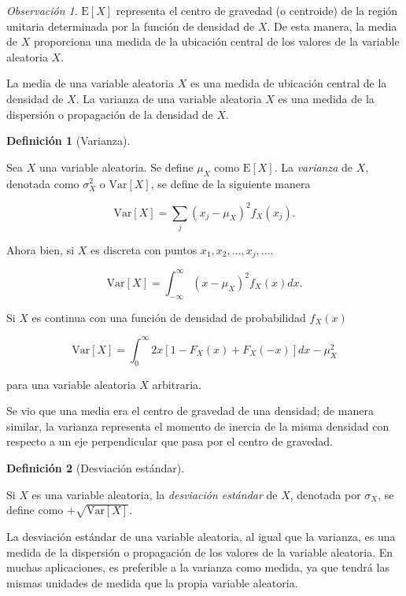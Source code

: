 \documentclass[
  us-letterpaper,
]{scrreprt}
\theoremstyle{plain}
\theoremstyle{definition}
\newtheorem{definition}{Definición}[chapter]
\theoremstyle{definition}
\theoremstyle{plain}
\theoremstyle{remark}
\newtheorem*{remark}{Observación}
\begin{document}
\begin{remark}
\(\mathrm E[X]\) representa el centro de gravedad (o centroide) de la
región unitaria determinada por la función de densidad de \(X\). De esta
manera, la media de \(X\) proporciona una medida de la ubicación central
de los valores de la variable aleatoria \(X\).
\end{remark}

La media de una variable aleatoria \(X\) es una medida de ubicación
central de la densidad de \(X\). La varianza de una variable aleatoria
\(X\) es una medida de la dispersión o propagación de la densidad de
\(X\).

\begin{definition}[Varianza]\protect\hypertarget{def-var}{}\label{def-var}

Sea \(X\) una variable aleatoria. Se define \(\mu_X\) como
\(\mathrm E[X]\). La \emph{varianza} de \(X\), denotada como
\(\sigma_X^2\) o \(\mathrm{Var}[X]\), se define de la siguiente manera

\[ \mathrm{Var}[X]= \sum_j (x_j-\mu_X)^2 f_X(x_j).\]

Ahora bien, si \(X\) es discreta con puntos
\(x_1, x_2, \ldots, x_j, \ldots\).

\[ \mathrm{Var}[X]=\int_{-\infty}^\infty (x-\mu_X)^2f_X(x)dx.\]

Si \(X\) es continua con una función de densidad de probabilidad
\(f_X(x)\)

\[ \mathrm{Var}[X]=\int_0^\infty 2x[1-F_X(x)+F_X(-x)]dx - \mu_X^2 \]

para una variable aleatoria \(X\) arbitraria.

\end{definition}

Se vio que una media era el centro de gravedad de una densidad; de
manera similar, la varianza representa el momento de inercia de la misma
densidad con respecto a un eje perpendicular que pasa por el centro de
gravedad.

\begin{definition}[Desviación
estándar]\protect\hypertarget{def-SD}{}\label{def-SD}

Si \(X\) es una variable aleatoria, la \emph{desviación estándar} de
\(X\), denotada por \(\sigma_X\), se define como
\(+\sqrt{\mathrm{Var}[X]}\).

\end{definition}

La desviación estándar de una variable aleatoria, al igual que la
varianza, es una medida de la dispersión o propagación de los valores de
la variable aleatoria. En muchas aplicaciones, es preferible a la
varianza como medida, ya que tendrá las mismas unidades de medida que la
propia variable aleatoria.
\end{document}
